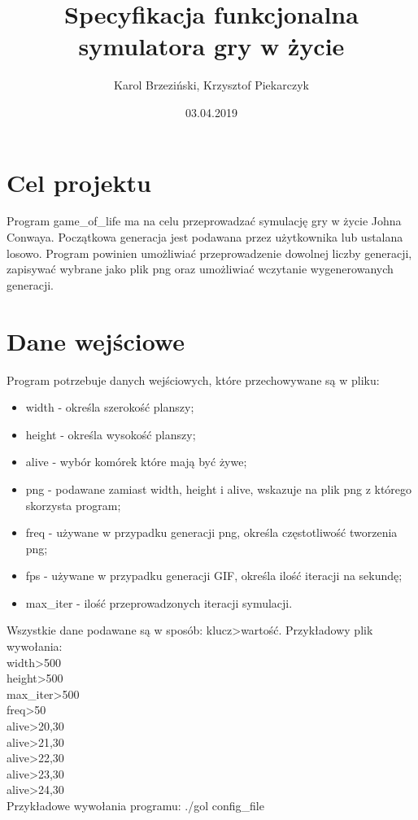 \documentclass[12pt]{article}
\title{Specyfikacja funkcjonalna symulatora gry w życie}
\author{Karol Brzeziński, Krzysztof Piekarczyk}
\date{03.04.2019}
\begin{document}
\maketitle

\section{Cel projektu}

Program game\_of\_life ma na celu przeprowadzać symulację gry w życie Johna Conwaya. Początkowa generacja jest podawana przez użytkownika lub ustalana losowo. Program powinien umożliwiać przeprowadzenie dowolnej liczby generacji, zapisywać wybrane jako plik png oraz umożliwiać wczytanie wygenerowanych generacji.


\section{Dane wejściowe}

Program potrzebuje danych wejściowych, które przechowywane są w pliku:
\begin{itemize}
	\item width - określa szerokość planszy;
	\item height - określa wysokość planszy;
	\item alive - wybór komórek które mają być żywe;
	\item png - podawane zamiast width, height i alive, wskazuje na plik png z którego skorzysta program;
	\item freq - używane w przypadku generacji png, określa częstotliwość tworzenia png;
	\item fps - używane w przypadku generacji GIF, określa ilość iteracji na sekundę;
	\item max\_iter - ilość przeprowadzonych iteracji symulacji.
\end{itemize}

Wszystkie dane podawane są w sposób: klucz\textgreater{}wartość.
Przykładowy plik wywołania:\\
width\textgreater{}500\\
height\textgreater{}500\\
max\_iter\textgreater{}500\\
freq\textgreater{}50\\
alive\textgreater{}20,30\\
alive\textgreater{}21,30\\
alive\textgreater{}22,30\\
alive\textgreater{}23,30\\
alive\textgreater{}24,30\\
Przykładowe wywołania programu:	./gol config\_file
\end{document}
